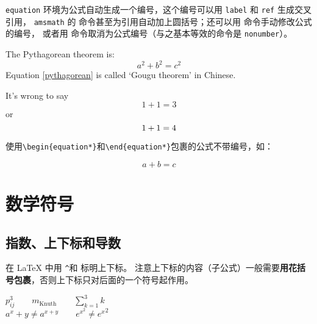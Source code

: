 \lstinline{equation} 环境为公式自动生成一个编号，这个编号可以用 \lstinline{label} 和 \lstinline{ref} 生成交叉引用，
\lstinline{amsmath} 的  命令甚至为引用自动加上圆括号；还可以用  命令手动修改公式的编号，
或者用  命令取消为公式编号（与之基本等效的命令是 \lstinline{nonumber}）。

\begin{codeshow}
    The Pythagorean theorem is:
    \begin{equation}
        a^2 + b^2 = c^2 \label{pythagorean}
    \end{equation}
    Equation \eqref{pythagorean} is
    called `Gougu theorem' in Chinese.

    It's wrong to say
    \begin{equation}
        1 + 1 = 3 \tag{dumb}
    \end{equation}
    or
    \begin{equation}
        1 + 1 = 4 \notag
    \end{equation}
\end{codeshow}


使用\lstinline|\begin{equation*}|和\lstinline|\end{equation*}|包裹的公式不带编号，如：

\begin{codeshow}
    \begin{equation*}
        a+b=c
    \end{equation*}
\end{codeshow}

\section{数学符号}\label{sec:math-symbols}
\subsection{指数、上下标和导数}\label{subsec:math-scripts}
在 \LaTeX{} 中用 \texttt\textasciicircum 和 \texttt\textunderscore 标明上下标。
注意上下标的内容（子公式）一般需要\textbf{用花括号包裹}，否则上下标只对后面的一个符号起作用。

\begin{codeshow}
    $p^3_{ij} \qquad
        m_\mathrm{Knuth}\qquad
        \sum_{k=1}^3 k $\\[5pt]
    $a^x+y \neq a^{x+y}\qquad
        e^{x^2} \neq {e^x}^2$
\end{codeshow}

